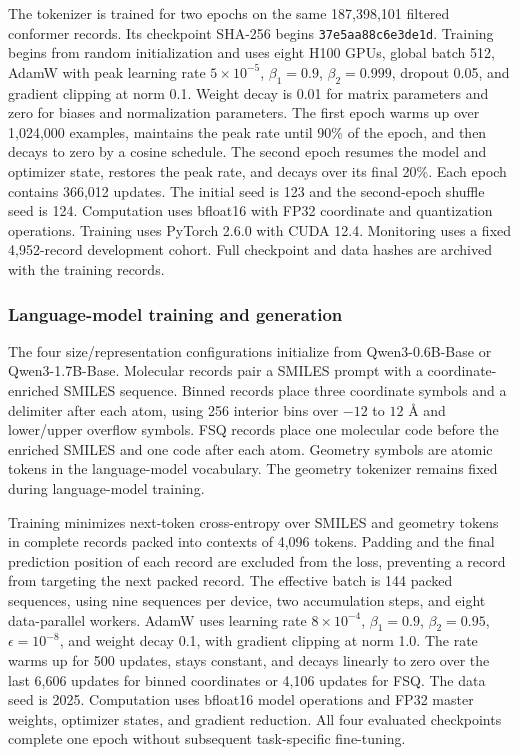 The tokenizer is trained for two epochs on the same 187,398,101 filtered conformer
records. Its checkpoint SHA-256 begins \texttt{37e5aa88c6e3de1d}. Training begins from random
initialization and uses eight H100 GPUs, global batch 512, AdamW with peak learning
rate $5\times10^{-5}$, $\beta_1=0.9$, $\beta_2=0.999$, dropout 0.05, and gradient
clipping at norm 0.1. Weight decay is 0.01 for matrix parameters and zero for biases
and normalization parameters. The first epoch warms up over 1,024,000 examples,
maintains the peak rate until 90\% of the epoch, and then decays to zero by a cosine
schedule. The second epoch resumes the model and optimizer state, restores the peak
rate, and decays over its final 20\%. Each epoch contains 366,012 updates. The initial
seed is 123 and the second-epoch shuffle seed is 124. Computation uses bfloat16 with
FP32 coordinate and quantization operations. Training uses PyTorch
2.6.0 with CUDA 12.4. Monitoring uses a fixed 4,952-record development cohort.
Full checkpoint and data hashes are archived with the training records.

\subsubsection*{Language-model training and generation}

The four size/representation configurations initialize from Qwen3-0.6B-Base or Qwen3-1.7B-Base.\cite{yang2025qwen3}
Molecular records pair a SMILES prompt with a coordinate-enriched SMILES sequence.
Binned records place three coordinate symbols and a delimiter after each atom,
using 256 interior bins over $-12$ to $12$ \AA{} and lower/upper overflow symbols.
FSQ records place one molecular code before the enriched SMILES and one code after
each atom. Geometry symbols are atomic tokens in the language-model vocabulary.
The geometry tokenizer remains fixed during language-model training.

Training minimizes next-token cross-entropy over SMILES and geometry tokens in complete
records packed into contexts of 4,096 tokens. Padding and the final prediction position of each record are
excluded from the loss, preventing a record from targeting the next packed record.
The effective batch is 144 packed sequences, using nine sequences per device,
two accumulation steps, and eight data-parallel workers. AdamW uses learning rate
$8\times10^{-4}$, $\beta_1=0.9$, $\beta_2=0.95$, $\epsilon=10^{-8}$, and weight decay
0.1, with gradient clipping at norm 1.0. The rate warms up for 500 updates, stays constant, and decays linearly to zero
over the last 6,606 updates for binned coordinates or 4,106 updates for FSQ.
The data seed is 2025. Computation uses bfloat16 model operations and FP32
master weights, optimizer states, and gradient reduction. All four evaluated
checkpoints complete one epoch without subsequent task-specific fine-tuning.

